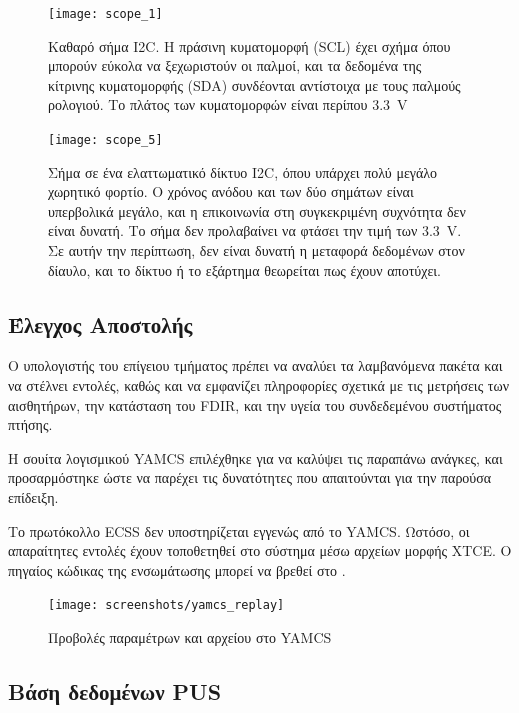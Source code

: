 \documentclass[a4paper,nobib]{tufte-book}
\begin{document}
\begin{figure}[h]
	\texttt{[image: scope\_1]}
	\caption{Καθαρό σήμα \acs{I2C}. Η πράσινη κυματομορφή (\acf{SCL}) έχει σχήμα όπου μπορούν εύκολα να ξεχωριστούν οι παλμοί, και τα δεδομένα της κίτρινης κυματομορφής (\acf{SDA}) συνδέονται αντίστοιχα με τους παλμούς ρολογιού. Το πλάτος των κυματομορφών είναι περίπου \SI{3.3}{\volt}}
	\label{subfig:i2c_clean}
\end{figure}

\begin{figure}[h]
	\texttt{[image: scope\_5]}
	\caption{Σήμα σε ένα ελαττωματικό δίκτυο \acs{I2C}, όπου υπάρχει πολύ μεγάλο χωρητικό φορτίο. Ο χρόνος ανόδου και των δύο σημάτων είναι υπερβολικά μεγάλο, και η επικοινωνία στη συγκεκριμένη συχνότητα δεν είναι δυνατή. Το σήμα δεν προλαβαίνει να φτάσει την τιμή των \SI{3.3}{\volt}. Σε αυτήν την περίπτωση, δεν είναι δυνατή η μεταφορά δεδομένων στον δίαυλο, και το δίκτυο ή το εξάρτημα θεωρείται πως έχουν αποτύχει.}
	\label{subfig:i2c_dirty}
\end{figure}

\FloatBarrier

\subsection{Έλεγχος Αποστολής}

Ο υπολογιστής του επίγειου τμήματος πρέπει να αναλύει τα λαμβανόμενα πακέτα και να στέλνει εντολές, καθώς και να εμφανίζει πληροφορίες σχετικά με τις μετρήσεις των αισθητήρων, την κατάσταση του \ac{FDIR}, και την υγεία του συνδεδεμένου συστήματος πτήσης.

Η σουίτα λογισμικού \acs{YAMCS} \autocite{sela_yamcs_lightweight_2012} επιλέχθηκε για να καλύψει τις παραπάνω ανάγκες, και προσαρμόστηκε ώστε να παρέχει τις δυνατότητες που απαιτούνται για την παρούσα επίδειξη.

Το πρωτόκολλο \ac{ECSS} \autocite{ECSS-E-ST-70-41C} δεν υποστηρίζεται εγγενώς από το \acs{YAMCS}. Ωστόσο, οι απαραίτητες εντολές έχουν τοποθετηθεί στο σύστημα μέσω αρχείων μορφής \ac{XTCE}.\autocite{simon_xtce_standard_2004} Ο πηγαίος κώδικας της ενσωμάτωσης μπορεί να βρεθεί στο .

\begin{figure}[h]
	\texttt{[image: screenshots/yamcs\_replay]}
	\caption{Προβολές παραμέτρων και αρχείου στο \acs{YAMCS}}
\end{figure}

\subsection{Βάση δεδομένων \acs{PUS}}
\label{sec:pusinterface}
\end{document}
